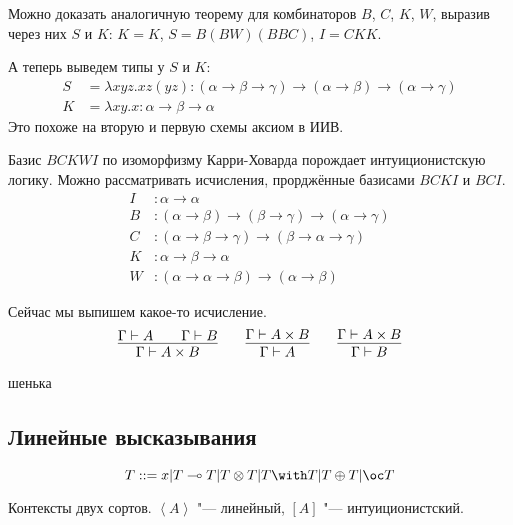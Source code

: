 Можно доказать аналогичную теорему для комбинаторов $B$, $C$, $K$, $W$, выразив через них $S$ и $K$:
$K = K$, $S = B (BW) (BBC)$, $I = CKK$.

А теперь выведем типы у $S$ и $K$:
\begin{align*}
    S &= \lambda x y z . x z (y z) : (\alpha \rightarrow \beta \rightarrow \gamma) \rightarrow
        (\alpha \rightarrow \beta) \rightarrow (\alpha \rightarrow \gamma) \\
    K &= \lambda x y . x : \alpha \rightarrow \beta \rightarrow \alpha
\end{align*}
Это похоже на вторую и первую схемы аксиом в ИИВ.

Базис $BCKWI$ по изоморфизму Карри-Ховарда порождает интуиционистскую логику.
Можно рассматривать исчисления, прорджённые базисами $BCKI$ и $BCI$.
\begin{align*}
    I &: \alpha \rightarrow \alpha \\
    B &: (\alpha \rightarrow \beta) \rightarrow (\beta \rightarrow \gamma) \rightarrow (\alpha \rightarrow \gamma) \\
    C &: (\alpha \rightarrow \beta \rightarrow \gamma) \rightarrow (\beta \rightarrow \alpha \rightarrow \gamma) \\
    K &: \alpha \rightarrow \beta \rightarrow \alpha \\
    W &: (\alpha \rightarrow \alpha \rightarrow \beta) \rightarrow (\alpha \rightarrow \beta)
\end{align*}

Сейчас мы выпишем какое-то исчисление.
\[
    \infer{\Gamma \vdash A \times B}{\Gamma \vdash A && \Gamma \vdash B} \qquad
    \infer{\Gamma \vdash A}{\Gamma \vdash A \times B} \qquad
    \infer{\Gamma \vdash B}{\Gamma \vdash A \times B}
\]

\todo{}шенька

\subsection{\texorpdfstring{Линейные высказывания}{Linear statements}}

\begin{definition}
    \begin{bnf}
    \[
        T ::= x | T \multimap T | T \otimes T | T \with T | T \oplus T | \oc T
    \]
    \end{bnf}
\end{definition}

Контексты двух сортов. $\left<A\right>$ "--- линейный, $\left[ A \right]$ "--- интуиционистский.

